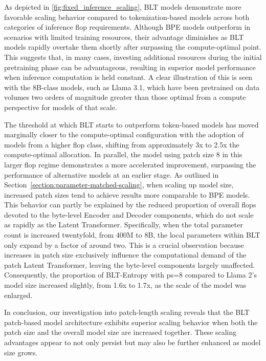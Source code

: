 As depicted in \autoref{fig:fixed_inference_scaling}, {\textsc BLT} models demonstrate more favorable scaling behavior compared to tokenization-based models across both categories of inference flop requirements. Although BPE models outperform in scenarios with limited training resources, their advantage diminishes as {\textsc BLT} models rapidly overtake them shortly after surpassing the compute-optimal point. This suggests that, in many cases, investing additional resources during the initial pretraining phase can be advantageous, resulting in superior model performance when inference computation is held constant. A clear illustration of this is seen with the 8B-class models, such as Llama 3.1, which have been pretrained on data volumes two orders of magnitude greater than those optimal from a compute perspective for models of that scale.

The threshold at which {\textsc BLT} starts to outperform token-based models has moved marginally closer to the compute-optimal configuration with the adoption of models from a higher flop class, shifting from approximately 3x to 2.5x the compute-optimal allocation. In parallel, the model using patch size 8 in this larger flop regime demonstrates a more accelerated improvement, surpassing the performance of alternative models at an earlier stage. As outlined in Section~\ref{section:parameter-matched-scaling}, when scaling up model size, increased patch sizes tend to achieve results more comparable to BPE models. This behavior can partly be explained by the reduced proportion of overall flops devoted to the byte-level Encoder and Decoder components, which do not scale as rapidly as the Latent Transformer. Specifically, when the total parameter count is increased twentyfold, from 400M to 8B, the local parameters within {\textsc BLT} only expand by a factor of around two. This is a crucial observation because increases in patch size exclusively influence the computational demand of the patch Latent Transformer, leaving the byte-level components largely unaffected. Consequently, the proportion of {\textsc BLT}-Entropy with ps=8 compared to Llama 2's model size increased slightly, from 1.6x to 1.7x, as the scale of the model was enlarged.

In conclusion, our investigation into patch-length scaling reveals that the {\textsc BLT} patch-based model architecture exhibits superior scaling behavior when both the patch size and the overall model size are increased together. These scaling advantages appear to not only persist but may also be further enhanced as model size grows.

